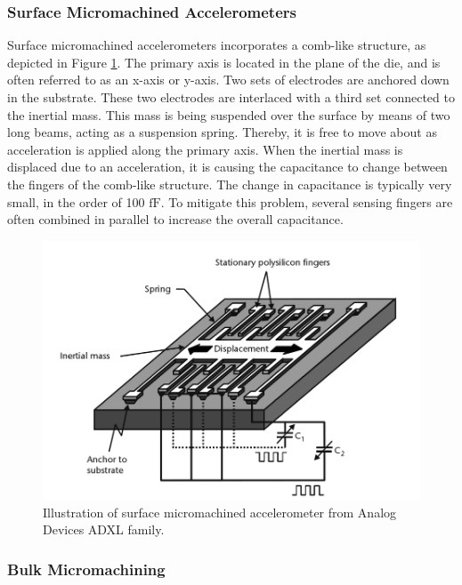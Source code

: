 \subsubsection{Surface Micromachined Accelerometers}

Surface micromachined accelerometers incorporates a comb-like structure, as depicted in Figure \ref{fig:surface_micromachined}. The primary axis is located in the plane of the die, and is often referred to as an x-axis or y-axis. Two sets of electrodes are anchored down in the substrate. These two electrodes are interlaced with a third set connected to the inertial mass. This mass is being suspended over the surface by means of two long beams, acting as a suspension spring. Thereby, it is free to move about as acceleration is applied along the primary axis. When the inertial mass is displaced due to an acceleration, it is causing the capacitance to change between the fingers of the comb-like structure. The change in capacitance is typically very small, in the order of 100 $\si{\femto\farad}$. To mitigate this problem, several sensing fingers are often combined in parallel to increase the overall capacitance.

\begin{figure}[h]
\centering
\includegraphics[scale=0.3]{fig/surface_micromachined.png}
\caption{Illustration of surface micromachined accelerometer from Analog Devices ADXL family. \cite[p.~101]{maluf04}}
\label{fig:surface_micromachined}
\end{figure}

\subsubsection{Bulk Micromachining}

